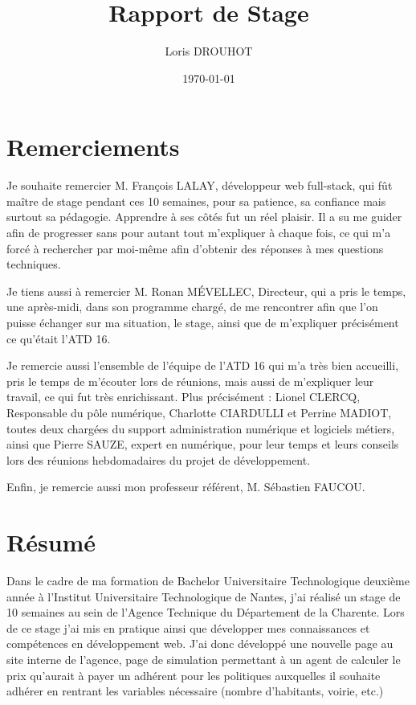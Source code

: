 \documentclass[a4paper,12pt]{report}
\title{Rapport de Stage}
\author{Loris DROUHOT}
\date{\today}
\begin{document}
\maketitle
\newpage
\thispagestyle{empty}

\chapter*{Remerciements}

Je souhaite remercier M. François LALAY, développeur web full-stack, qui fût maître de stage pendant ces 10 semaines, pour sa patience, sa confiance mais surtout sa pédagogie. Apprendre à ses côtés fut un réel plaisir. Il a su me guider afin de progresser sans pour autant tout m'expliquer à chaque fois, ce qui m’a forcé à rechercher par moi-même afin d’obtenir des réponses à mes questions techniques.

\vspace{1em}

Je tiens aussi à remercier M. Ronan MÉVELLEC, Directeur, qui a pris le temps, une après-midi, dans son programme chargé, de me rencontrer afin que l’on puisse échanger sur ma situation, le stage, ainsi que de m’expliquer précisément ce qu’était l’ATD 16.

\vspace{1em}

Je remercie aussi l’ensemble de l’équipe de l’ATD 16 qui m’a très bien accueilli, pris le temps de m’écouter lors de réunions, mais aussi de m’expliquer leur travail, ce qui fut très enrichissant. Plus précisément : Lionel CLERCQ, Responsable du pôle numérique, Charlotte CIARDULLI et Perrine MADIOT, toutes deux chargées du support administration numérique et logiciels métiers, ainsi que Pierre SAUZE, expert en numérique, pour leur temps et leurs conseils lors des réunions hebdomadaires du projet de développement.

\vspace{1em}

Enfin, je remercie aussi mon professeur référent, M. Sébastien FAUCOU.

\newpage
\chapter*{Résumé}
\thispagestyle{empty}

Dans le cadre de ma formation de Bachelor Universitaire Technologique deuxième année à l’Institut Universitaire Technologique de Nantes, j’ai réalisé un stage de 10 semaines au sein de l’Agence Technique du Département de la Charente. Lors de ce stage j’ai mis en pratique ainsi que développer mes connaissances et compétences en développement web. J’ai donc développé une nouvelle page au site interne de l’agence, page de simulation permettant à un agent de calculer le prix qu’aurait à payer un adhérent pour les politiques auxquelles il souhaite adhérer en rentrant les variables nécessaire (nombre d’habitants, voirie, etc.)
\end{document}
